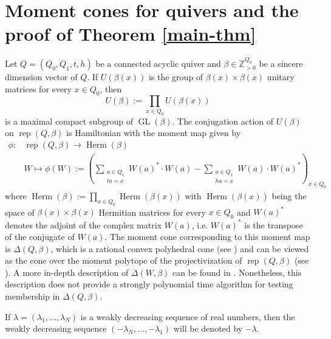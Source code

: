 \documentclass[11pt]{article}
\theoremstyle{definition}
\numberwithin{equation}{section}
\newcommand{\rep}{\operatorname{rep}}
\newcommand{\GL}{\operatorname{GL}}
\newcommand{\ZZ}{\mathbb Z}
\DeclareMathOperator{\Herm}{\operatorname{Herm}}
\begin{document}
\section{Moment cones for quivers and the proof of Theorem \ref{main-thm}}\label{moment-cones-proof-thm-1-sec}
Let $Q=(Q_0,Q_1,t,h)$ be a connected acyclic quiver and $\beta \in \ZZ_{>0}^{Q_0}$ be a sincere dimension vector of $Q$. If $U(\beta(x))$ is the group of $\beta(x) \times \beta(x)$ unitary matrices for every $x \in Q_0$, then 
\[
U(\beta) := \prod_{x \in Q_0} U(\beta(x))
\]
is a maximal compact subgroup of $\GL(\beta)$. The conjugation action of $U(\beta)$ on $\rep(Q,\beta)$ is Hamiltonian with the moment map given by 
\begin{align*}
\phi: & \rep(Q,\beta) \to \Herm(\beta)\\
& W \mapsto \phi(W) := \left( \sum_{\substack{a \in Q_1 \\ ta=x}} W(a)^* \cdot W(a) - \sum_{\substack{a \in Q_1 \\ ha=x}} W(a) \cdot W(a)^*\right)_{x \in Q_0}
\end{align*}
where $\Herm(\beta) := \prod_{x \in Q_0} \Herm(\beta(x))$ with $\Herm(\beta(x))$ being the space of $\beta(x) \times \beta(x)$ Hermitian matrices for every $x \in Q_0$ and  $W(a)^*$ denotes the adjoint of the complex matrix $W(a)$, i.e. $W(a)^*$ is the transpose of the conjugate of $W(a)$. The moment cone corresponding to this moment map is $\Delta(Q,\beta)$, which is a rational convex polyhedral cone (see \cite[Theorem 4.9]{Sj}) and  can be viewed as the cone over the moment polytope of the projectivization of $\rep(Q,\beta)$ (see \cite[Corollary 4.11]{Sj}). A more in-depth description of $\Delta(W, \beta)$ can be found in \cite{Bal-Ver-Wal-2023}. Nonetheless, this description does not provide a strongly polynomial time algorithm for testing membership in $\Delta(Q, \beta)$.

If $\lambda=(\lambda_1, \ldots, \lambda_N)$ is a weakly decreasing sequence of real numbers, then the weakly decreasing sequence $(-\lambda_N, \ldots, -\lambda_1)$ will be denoted by $-\lambda$. 
\end{document}
